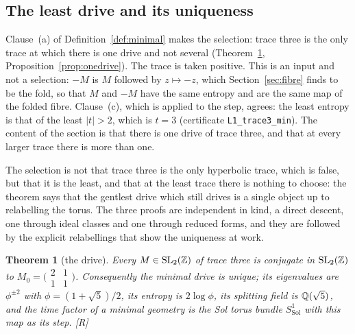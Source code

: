 \documentclass[11pt,a4paper]{article}
\theoremstyle{plain}
\newtheorem{theorem}{Theorem}[section]
\theoremstyle{definition}
\theoremstyle{remark}
\newcommand{\Sol}{\mathrm{Sol}}
\newcommand{\rigR}{[\textup{R}]}
\begin{document}
\subsection{The least drive and its uniqueness}

Clause~(a) of Definition~\ref{def:minimal} makes the selection: trace three is the only trace at which there is one drive and not several (Theorem~\ref{thm:drive}, Proposition~\ref{prop:onedrive}). The trace is taken positive. This is an input and not a selection: $-M$ is $M$ followed by $z\mapsto-z$, which Section~\ref{sec:fibre} finds to be the fold, so that $M$ and $-M$ have the same entropy and are the same map of the folded fibre. Clause~(c), which is applied to the step, agrees: the least entropy is that of the least $\lvert t\rvert>2$, which is $t=3$ (certificate \texttt{L1\_trace3\_min}). The content of the section is that there is one drive of trace three, and that at every larger trace there is more than one.

The selection is not that trace three is the only hyperbolic trace, which is false, but that it is the least, and that at the least trace there is nothing to choose: the theorem says that the gentlest drive which still drives is a single object up to relabelling the torus. The three proofs are independent in kind, a direct descent, one through ideal classes and one through reduced forms, and they are followed by the explicit relabellings that show the uniqueness at work.

\begin{theorem}[the drive]\label{thm:drive}
Every $M\in\mathrm{SL}_{2}(\mathbb{Z})$ of trace three is conjugate in $\mathrm{SL}_{2}(\mathbb{Z})$ to $M_{0}=\bigl(\begin{smallmatrix}2&1\\1&1\end{smallmatrix}\bigr)$. Consequently the minimal drive is unique; its eigenvalues are $\phi^{\pm2}$ with $\phi=(1+\sqrt5)/2$, its entropy is $2\log\phi$, its splitting field is $\mathbb{Q}(\sqrt5)$, and the time factor of a minimal geometry is the Sol torus bundle $S^{1}_{\Sol}$ with this map as its step. \rigR
\end{theorem}
\end{document}
